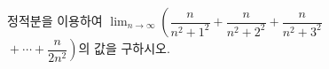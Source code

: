 정적분을 이용하여 $\displaystyle\lim_{n\to\infty}\left(\dfrac{n}{n^2+1^2}+\dfrac{n}{n^2+2^2}+\dfrac{n}{n^2+3^2}\right.$\\ \mbox{}\qquad $\left.{}+\cdots+\dfrac{n}{2n^2}\right)$의 값을 구하시오.
